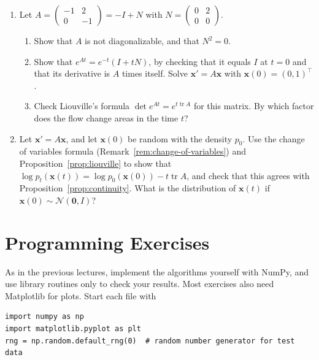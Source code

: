 \documentclass[11pt]{article}
\theoremstyle{definition}
\theoremstyle{plain}
\theoremstyle{remark}
\DeclareMathOperator{\tr}{tr}
\begin{document}
\begin{enumerate}[leftmargin=*]
\begin{enumerate}[label=(\alph*)]
    \end{enumerate}
    \item\label{ex3:nilpotent} Let $A = \begin{pmatrix} -1 & 2 \\ 0 & -1 \end{pmatrix} = -I + N$ with $N = \begin{pmatrix} 0 & 2 \\ 0 & 0 \end{pmatrix}$.
    \begin{enumerate}[label=(\alph*)]
        \item Show that $A$ is not diagonalizable, and that $N^2 = 0$.
        \item Show that $e^{At} = e^{-t}(I + tN)$, by checking that it equals $I$ at $t = 0$ and that its derivative is $A$ times itself. Solve $\mathbf{x}' = A\mathbf{x}$ with $\mathbf{x}(0) = (0, 1)^\top$.
        \item Check Liouville's formula $\det e^{At} = e^{t\tr A}$ for this matrix. By which factor does the flow change areas in the time $t$?
    \end{enumerate}
    \item Let $\mathbf{x}' = A\mathbf{x}$, and let $\mathbf{x}(0)$ be random with the density $p_0$. Use the change of variables formula (Remark~\ref{rem:change-of-variables}) and Proposition~\ref{prop:liouville} to show that $\log p_t(\mathbf{x}(t)) = \log p_0(\mathbf{x}(0)) - t\tr A$, and check that this agrees with Proposition~\ref{prop:continuity}. What is the distribution of $\mathbf{x}(t)$ if $\mathbf{x}(0) \sim \mathcal{N}(\mathbf{0}, I)$?
\end{enumerate}

\section{Programming Exercises}\label{sec:programming}

\setlength{\emergencystretch}{3em}

As in the previous lectures, implement the algorithms yourself with NumPy, and use library routines only to check your results. Most exercises also need Matplotlib for plots. Start each file with
\begin{lstlisting}
import numpy as np
import matplotlib.pyplot as plt
rng = np.random.default_rng(0)  # random number generator for test data
\end{lstlisting}
\end{document}

